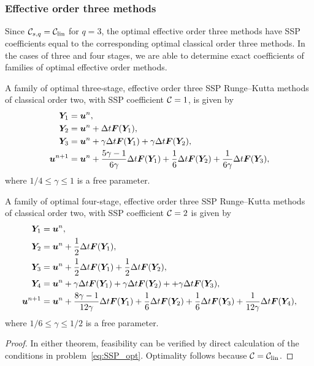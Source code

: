 \subsubsection{Effective order three methods}\label{subsubsec:3rd_ESSPRK}
Since $\mathcal{C}_{s,q}=\mathcal{C}_{\text{lin}}$ for $q=3$, the optimal effective order three methods
have SSP coefficients equal to the corresponding optimal classical order three methods.
In the cases of three and four stages, we are able to determine exact coefficients of
families of optimal effective order methods.
\begin{theorem}\label{thm:ESSPRK(3,3,2)}
	A family of optimal three-stage, effective order three SSP Runge--Kutta 
	methods of classical order two, with SSP coefficient $\mathcal{C}=1$, is given by
    \begin{displaymath}
    		\begin{split}
    			\bm{Y}_1 &= \bm{u}^n, \\
    			\bm{Y}_2 &= \bm{u}^n + \Delta t\bm{F}(\bm{Y}_1), \\
    			\bm{Y}_3 &= \bm{u}^n + \gamma\Delta t\bm{F}(\bm{Y}_1) + \gamma\Delta t\bm{F}(\bm{Y}_2), \\
    			\bm{u}^{n+1} &= \bm{u}^n + \frac{5\gamma-1}{6\gamma}\Delta t\bm{F}(\bm{Y}_1) + \frac{1}{6}\Delta t\bm{F}(\bm{Y}_2) + \frac{1}{6\gamma}\Delta t\bm{F}(\bm{Y}_3),
        \end{split}
    \end{displaymath}
    where $1/4 \leq \gamma \leq 1$ is a free parameter.
\end{theorem}
\begin{theorem}\label{thm:ESSPRK(4,3,2)}
	A family of optimal four-stage, effective order three SSP Runge--Kutta 
	methods of classical order two, with SSP coefficient $\mathcal{C}=2$ is given by
    \begin{displaymath}
    		\begin{split}
    			\bm{Y}_1 &= \bm{u}^n, \\
    			\bm{Y}_2 &= \bm{u}^n + \frac{1}{2}\Delta t\bm{F}(\bm{Y}_1), \\
    			\bm{Y}_3 &= \bm{u}^n + \frac{1}{2}\Delta t\bm{F}(\bm{Y}_1) + \frac{1}{2}\Delta t\bm{F}(\bm{Y}_2), \\
    			\bm{Y}_4 &= \bm{u}^n + \gamma\Delta t\bm{F}(\bm{Y}_1) + \gamma\Delta t\bm{F}(\bm{Y}_2) + + \gamma\Delta t\bm{F}(\bm{Y}_3), \\
    			\bm{u}^{n+1} &= \bm{u}^n + \frac{8\gamma-1}{12\gamma}\Delta t\bm{F}(\bm{Y}_1) + \frac{1}{6}\Delta t\bm{F}(\bm{Y}_2) + \frac{1}{6}\Delta t\bm{F}(\bm{Y}_3) + \frac{1}{12\gamma}\Delta t\bm{F}(\bm{Y}_4),
        \end{split}
    \end{displaymath}
    where $ 1/6 \leq \gamma \leq 1/2 $ is a free parameter.
\end{theorem}
\begin{proof}
	In either theorem, feasibility can be verified by direct calculation of the 
	conditions in problem~\eqref{eq:SSP_opt}. Optimality follows because 
	$\mathcal{C}=\mathcal{C}_{\text{lin}}$.
\end{proof}


